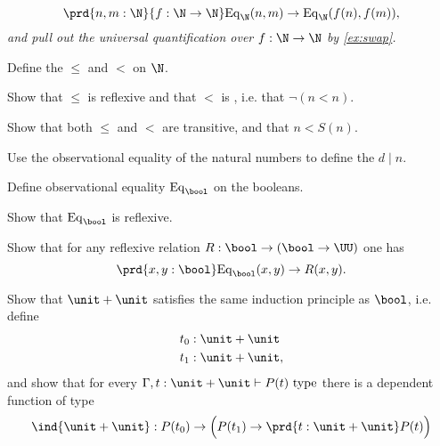 \begin{exercises}
\begin{equation*}
\prd{n,m:\N}{f:\N\to\N} \mathrm{Eq}_\N(n,m)\to \mathrm{Eq}_\N(f(n),f(m)),
\end{equation*}
\emph{and pull out the universal quantification over $f:\N\to\N$ by \autoref{ex:swap}.}
\item 
\begin{subexenum}
\item Define the  $\leq$ and $<$ on $\N$.
\item Show that $\leq$ is reflexive and that $<$ is , i.e. that $\neg(n<n)$. 
\item Show that both $\leq$ and $<$ are transitive, and that $n<S(n)$. 
\end{subexenum}
\item {}Use the observational equality of the natural numbers to define the  $d\mid n$. 
\item \label{ex:obs_bool}
\begin{subexenum}
\item Define observational equality $\mathrm{Eq}_\bool$ on the booleans.
\item Show that $\mathrm{Eq}_\bool$ is reflexive.
\item Show that for any reflexive relation $R:\bool\to(\bool\to \UU)$ one has
\begin{equation*}
\prd{x,y:\bool} \mathrm{Eq}_\bool(x,y)\to R(x,y).
\end{equation*}
\end{subexenum}
\item \label{ex:one_plus_one} Show that $\unit+\unit$ satisfies the same induction principle as $\bool$, i.e. define
\begin{align*}
t_0 & : \unit + \unit \\
t_1 & : \unit + \unit,
\end{align*}
and show that for every $\Gamma,t:\unit+\unit\vdash P(t)~\mathrm{type}$ there is a dependent function of type
\begin{align*}
\ind{\unit+\unit}:P(t_0)\to \Big(P(t_1)\to \prd{t:\unit+\unit}P(t)\Big)

\end{align*}
\end{exercises}
